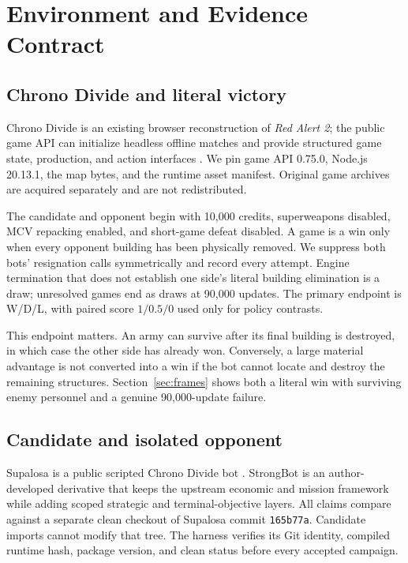 \section{Environment and Evidence Contract}
\label{sec:environment}

\subsection{Chrono Divide and literal victory}

Chrono Divide is an existing browser reconstruction of \emph{Red Alert 2}; the
public game API can initialize headless offline matches and provide structured
game state, production, and action interfaces
\cite{chronodivide2026,chronodivideGameApi2026}. We pin game API 0.75.0,
Node.js 20.13.1, the map bytes, and the runtime asset manifest. Original game
archives are acquired separately and are not redistributed.

The candidate and opponent begin with 10,000 credits, superweapons disabled,
MCV repacking enabled, and short-game defeat disabled. A game is a win only
when every opponent building has been physically removed. We suppress both
bots' resignation calls symmetrically and record every attempt. Engine
termination that does not establish one side's literal building elimination is
a draw; unresolved games end as draws at 90,000 updates. The primary endpoint
is W/D/L, with paired score $1/0.5/0$ used only for policy contrasts.

This endpoint matters. An army can survive after its final building is
destroyed, in which case the other side has already won. Conversely, a large
material advantage is not converted into a win if the bot cannot locate and
destroy the remaining structures. Section~\ref{sec:frames} shows both a literal
win with surviving enemy personnel and a genuine 90,000-update failure.

\subsection{Candidate and isolated opponent}

Supalosa is a public scripted Chrono Divide bot
\cite{supalosa2026bot}. StrongBot is an author-developed derivative that keeps
the upstream economic and mission framework while adding scoped strategic and
terminal-objective layers. All claims compare against a separate clean checkout
of Supalosa commit \texttt{165b77a}. Candidate imports cannot modify that tree.
The harness verifies its Git identity, compiled runtime hash, package version,
and clean status before every accepted campaign.

